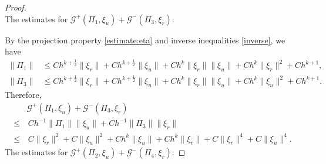 \documentclass[11pt]{article}
\newcommand{\Gcal} {\mathcal{G}}
\numberwithin{equation}{section}
\begin{document}
\begin{proof}
 \\
The estimates for $\Gcal^+(\Pi_1, \xi_u)+\Gcal^-(\Pi_3, \xi_r)$:
\vspace{0.2cm}

By the projection property \eqref{estimate:eta} and inverse inequalities \eqref{inverse}, we have
\begin{align*}
\|\Pi_1\|&\leq Ch^{k+\frac12}\|\xi_r\|+Ch^{k+\frac12}\|\xi_u\|+Ch^{k}\|\xi_r\|\|\xi_u\|+Ch^{k}\|\xi_r\|^2+Ch^{k+1},\\
\|\Pi_3\|&\leq Ch^{k+\frac12}\|\xi_r\|+Ch^{k+\frac12}\|\xi_u\|+Ch^{k}\|\xi_r\|\|\xi_u\|+Ch^{k}\|\xi_u\|^2+Ch^{k+1}.
\end{align*}
Therefore,
\begin{align*}
&\Gcal^+(\Pi_1, \xi_u)+\Gcal^-(\Pi_3, \xi_r)\\
\leq&\, Ch^{-1}\|\Pi_1\|\|\xi_u\|+Ch^{-1}\|\Pi_3\|\|\xi_r\|\\
\leq&\, C\|\xi_r\|^2+C\|\xi_u\|^2+Ch^{k}\|\xi_u\|+Ch^{k}\|\xi_r\|+C\|\xi_r\|^4+C\|\xi_u\|^4.
\end{align*}
The estimates for $\Gcal^+(\Pi_2, \xi_u)+\Gcal^-(\Pi_4, \xi_r)$:
\vspace{0.2cm}


\end{proof}
\end{document}
